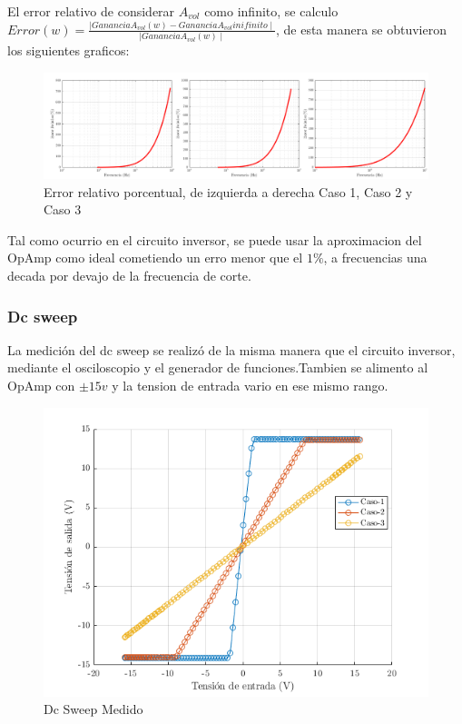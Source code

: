 \documentclass[../../main.tex]{subfiles}
\begin{document}
El error relativo de considerar $A_{vol}$  como infinito, se calculo $ Error(w) = \frac {\mid Ganancia A_{vol}(w) -Ganancia A_{vol} inifinito \mid} {\mid Ganancia A_{vol} (w) \mid }$, de esta manera se obtuvieron los siguientes graficos:

\begin{figure}[H]
\centering
\includegraphics[width=1\textwidth]{imagenes/error_n.png}
\caption{Error relativo porcentual, de izquierda a derecha Caso 1, Caso 2 y Caso 3} \label{fig=errorn}
\end{figure}

Tal como ocurrio en el circuito inversor, se puede usar la aproximacion del OpAmp como ideal cometiendo un erro menor que el $1\%$, a frecuencias una decada por devajo de la frecuencia de corte.


\subsubsection{Dc sweep}
La medición del dc sweep se realizó de la misma manera que el circuito inversor, mediante el osciloscopio y el generador de funciones.Tambien se alimento al OpAmp con $\pm 15 v$ y la tension de entrada vario en ese mismo rango.

\begin{figure}[H]
\centering
\includegraphics[width=1\textwidth]{imagenes/dc_sweep_n.png}
\caption{Dc Sweep Medido} \label{fig=dcn}
\end{figure}
\end{document}
